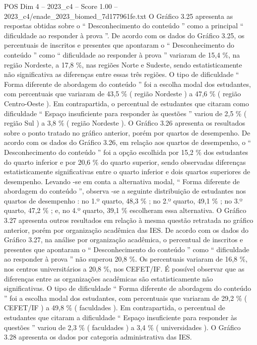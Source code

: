 \begin{textsample}{POS Dim 4 – 2023\_c4 – Score 1.00 – 2023\_c4/enade\_2023\_biomed\_7d177961fe.txt}
O Gráfico 3.25 apresenta as respostas obtidas sobre o “ Desconhecimento do conteúdo ” como a principal “ dificuldade ao responder à prova ”.
De acordo com os dados do Gráfico 3.25, os percentuais de inscritos e presentes que apontaram o “ Desconhecimento do conteúdo ” como “ dificuldade ao responder à prova ” variaram de 15,4 \%, na região Nordeste, a 17,8 \%, nas regiões Norte e Sudeste, sendo estatisticamente não significativa as diferenças entre essas três regiões.
O tipo de dificuldade “ Forma diferente de abordagem do conteúdo ” foi a escolha modal dos estudantes, com percentuais que variaram de 43,5 \% ( região Nordeste ) a 47,6 \% ( região Centro-Oeste ).
Em contrapartida, o percentual de estudantes que citaram como dificuldade “ Espaço insuficiente para responder às questões ” variou de 2,5 \% ( região Sul ) a 3,8 \% ( região Nordeste ).
O Gráfico 3.26 apresenta os resultados sobre o ponto tratado no gráfico anterior, porém por quartos de desempenho.
De acordo com os dados do Gráfico 3.26, em relação aos quartos de desempenho, o “ Desconhecimento do conteúdo ” foi a opção escolhida por 15,2 \% dos estudantes do quarto inferior e por 20,6 \% do quarto superior, sendo observadas diferenças estatisticamente significativas entre o quarto inferior e dois quartos superiores de desempenho.
Levando -se em conta a alternativa modal, “ Forma diferente de abordagem do conteúdo ”, observa -se a seguinte distribuição de estudantes nos quartos de desempenho : no 1.º quarto, 48,3 \% ; no 2.º quarto, 49,1 \% ; no 3.º quarto, 47,2 \% ; e, no 4.º quarto, 39,1 \% escolheram essa alternativa.
O Gráfico 3.27 apresenta outros resultados em relação à mesma questão retratada no gráfico anterior, porém por organização acadêmica das IES.
De acordo com os dados do Gráfico 3.27, na análise por organização acadêmica, o percentual de inscritos e presentes que apontaram o “ Desconhecimento do conteúdo ” como “ dificuldade ao responder à prova ” não superou 20,8 \%.
Os percentuais variaram de 16,8 \%, nos centros universitários a 20,8 \%, nos CEFET/IF.
É possível observar que as diferenças entre as organizações acadêmicas são estatisticamente não significativas.
O tipo de dificuldade “ Forma diferente de abordagem do conteúdo ” foi a escolha modal dos estudantes, com percentuais que variaram de 29,2 \% ( CEFET/IF ) a 49,8 \% ( faculdades ).
Em contrapartida, o percentual de estudantes que citaram a dificuldade “ Espaço insuficiente para responder às questões ” variou de 2,3 \% ( faculdades ) a 3,4 \% ( universidades ).
O Gráfico 3.28 apresenta os dados por categoria administrativa das IES.

\end{textsample}
